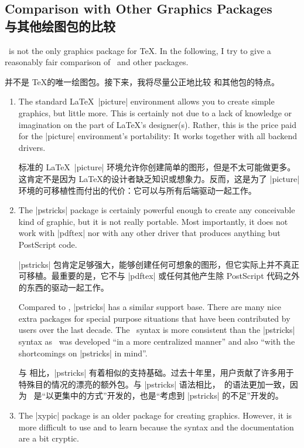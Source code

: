\subsection{Comparison with Other Graphics Packages\\与其他绘图包的比较}

\tikzname\ is not the only graphics package for \TeX. In the following, I try
to give a reasonably fair comparison of \tikzname\ and other packages.
%

\tikzname 并不是 \TeX 的唯一绘图包。接下来，我将尽量公正地比较 \tikzname 和其他包的特点。

\begin{enumerate}
    \item The standard \LaTeX\ |{picture}| environment allows you to create
        simple graphics, but little more. This is certainly not due to a lack
        of knowledge or imagination on the part of \LaTeX's designer(s).
        Rather, this is the price paid for the |{picture}| environment's
        portability: It works together with all backend drivers.

        标准的 \LaTeX\ |{picture}| 环境允许你创建简单的图形，但是不太可能做更多。这肯定不是因为 \LaTeX 的设计者缺乏知识或想象力。反而，这是为了 |{picture}| 环境的可移植性而付出的代价：它可以与所有后端驱动一起工作。
    \item The |pstricks| package is certainly powerful enough to create any
        conceivable kind of graphic, but it is not really portable. Most
        importantly, it does not work with |pdftex| nor with any other driver
        that produces anything but PostScript code.

        |pstricks| 包肯定足够强大，能够创建任何可想象的图形，但它实际上并不真正可移植。最重要的是，它不与 |pdftex| 或任何其他产生除 PostScript 代码之外的东西的驱动一起工作。

        Compared to \tikzname, |pstricks| has a similar support base. There
        are many nice extra packages for special purpose situations that have
        been contributed by users over the last decade. The \tikzname\ syntax
        is more consistent than the |pstricks| syntax as \tikzname\ was
        developed ``in a more centralized manner'' and also ``with the
        shortcomings on |pstricks| in mind''.

        与 \tikzname 相比，|pstricks| 有着相似的支持基础。过去十年里，用户贡献了许多用于特殊目的情况的漂亮的额外包。与 |pstricks| 语法相比，\tikzname\ 的语法更加一致，因为 \tikzname\ 是“以更集中的方式”开发的，也是“考虑到 |pstricks| 的不足”开发的。
    \item The |xypic| package is an older package for creating graphics.
        However, it is more difficult to use and to learn because the syntax
        and the documentation are a bit cryptic.


\end{enumerate}
